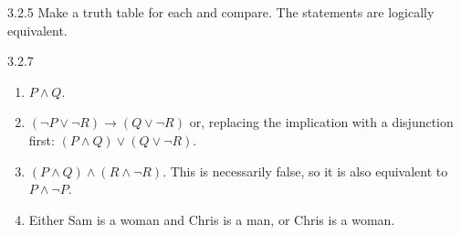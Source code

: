 \documentclass[11pt,]{book}
\theoremstyle{ptxplainnotitle}
\theoremstyle{ptxplaintitle}
\theoremstyle{ptxdefinitionnotitle}
\theoremstyle{ptxdefinitiontitle}
\theoremstyle{ptxdefinitionnotitle}
\theoremstyle{ptxdefinitiontitle}
\theoremstyle{ptxdefinitionnotitle}
\theoremstyle{ptxdefinitiontitle}
\theoremstyle{ptxdefinitiontitlenonumber}
\theoremstyle{ptxdefinitiontitlenonumber}
\numberwithin{equation}{chapter}
\newcommand{\imp}{\rightarrow}
\begin{document}
\begin{divisionexercise}{3.2.5}
\textbf{}\hypertarget{p-2228}{}%
Make a truth table for each and compare. The statements are logically equivalent.%
\end{divisionexercise}%
\begin{divisionexercise}{3.2.7}
\textbf{}\hypertarget{p-2232}{}%
\leavevmode%
\begin{enumerate}[label=(\alph*)]
\item\hypertarget{li-1094}{}\(P \wedge Q\).%
\item\hypertarget{li-1095}{}\((\neg P \vee \neg R) \imp (Q \vee \neg R)\) or, replacing the implication with a disjunction first: \((P \wedge Q) \vee (Q \vee \neg R)\).%
\item\hypertarget{li-1096}{}\hypertarget{p-2233}{}%
\((P \wedge Q) \wedge (R \wedge \neg R)\). This is necessarily false, so it is also equivalent to \(P \wedge \neg P\).%
\item\hypertarget{li-1097}{}\hypertarget{p-2234}{}%
Either Sam is a woman and Chris is a man, or Chris is a woman.%
\end{enumerate}
%
\end{divisionexercise}%
\end{document}
